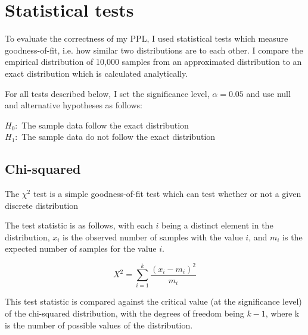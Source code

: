 





\section{Statistical tests}
To evaluate the correctness of my PPL, I used statistical tests which measure goodness-of-fit, i.e. how similar two distributions are to each other. I compare the empirical distribution of 10,000 samples from an approximated distribution to an exact distribution which is calculated analytically. 

For all tests described below, I set the significance level, $\alpha = 0.05$ and use null and alternative hypotheses as follows:

$H_0:$ The sample data follow the exact distribution\\
$H_1:$ The sample data do not follow the exact distribution


\subsection{Chi-squared}

The $\chi^2$ test is a simple goodness-of-fit test which can test whether or not a given discrete distribution 


The test statistic is as follows, with each $i$ being a distinct element in the distribution, $x_i$ is the observed number of samples with the value $i$, and $m_i$ is the expected number of samples for the value $i$.

$$X^{2}=\sum _{i=1}^{k}{\frac {(x_{i}-m_{i})^{2}}{m_{i}}}$$

This test statistic is compared against the critical value (at the significance level) of the chi-squared distribution, with the degrees of freedom being $k-1$, where k is the number of possible values of the distribution.
